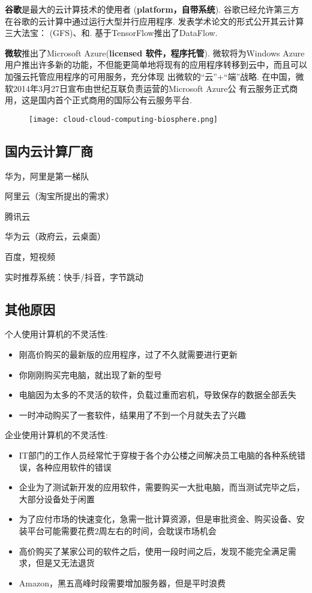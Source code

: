 \textbf{谷歌}是最大的云计算技术的使用者 (\textbf{platform，自带系统}). 谷歌已经允许第三方在谷歌的云计算中通过运行大型并行应用程序. 发表学术论文的形式公开其云计算三大法宝： (GFS)、和. 基于TensorFlow推出了DataFlow.


\textbf{微软}推出了Microsoft Azure(\textbf{licensed 软件，程序托管}). 微软将为Windows Azure用户推出许多新的功能，不但能更简单地将现有的应用程序转移到云中，而且可以加强云托管应用程序的可用服务，充分体现 出微软的“云”+“端”战略. 在中国，微软2014年3月27日宣布由世纪互联负责运营的Microsoft Azure公 有云服务正式商用，这是国内首个正式商用的国际公有云服务平台. 

\begin{figure}[htbp]
    \centering
    \texttt{[image: cloud-cloud-computing-biosphere.png]}
\end{figure}

\subsection{国内云计算厂商}

华为，阿里是第一梯队

阿里云（淘宝所提出的需求） 

腾讯云 

华为云（政府云，云桌面）

百度，短视频

实时推荐系统：快手/抖音，字节跳动

\subsection{其他原因}

个人使用计算机的不灵活性:

\begin{itemize}
    \item 刚高价购买的最新版的应用程序，过了不久就需要进行更新
    \item 你刚刚购买完电脑，就出现了新的型号
    \item 电脑因为太多的不灵活的软件，负载过重而宕机，导致保存的数据全部丢失
    \item 一时冲动购买了一套软件，结果用了不到一个月就失去了兴趣
\end{itemize}

企业使用计算机的不灵活性:

\begin{itemize}
    
    \item IT部门的工作人员经常忙于穿梭于各个办公楼之间解决员工电脑的各种系统错误，各种应用软件的错误
    \item 企业为了测试新开发的应用软件，需要购买一大批电脑，而当测试完毕之后，大部分设备处于闲置
    \item 为了应付市场的快速变化，急需一批计算资源，但是审批资金、购买设备、安装平台可能需要花费2周左右的时间，会耽误市场机会
    \item 高价购买了某家公司的软件之后，使用一段时间之后，发现不能完全满足需求，但是又无法退货
    \item Amazon，黑五高峰时段需要增加服务器，但是平时浪费
\end{itemize}

